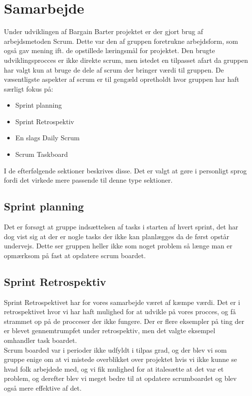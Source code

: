 \chapter{Samarbejde}

Under udviklingen af Bargain Barter projektet er der gjort brug af arbejdsmetoden Scrum. Dette var den af gruppen foretrukne arbejdsform, som også gav mening ift. de opstillede læringsmål for projektet. Den brugte udviklingsprocces er ikke direkte scrum, men istedet en tilpasset afart da gruppen har valgt kun at bruge de dele af scrum der bringer værdi til gruppen. De væsentligste aspekter af scrum er til gengæld opretholdt hvor gruppen har haft særligt fokus på:

\begin{itemize}
	\item Sprint planning
	\item Sprint Retrospektiv
	\item En slags Daily Scrum
	\item Scrum Taskboard
\end{itemize}

I de efterfølgende sektioner beskrives disse. Det er valgt at gøre i personligt sprog fordi det virkede mere passende til denne type sektioner. 

\section{Sprint planning}
Det er forsøgt at gruppe indsættelsen af tasks i starten af hvert sprint, det har dog vist sig at der er nogle tasks der ikke kan planlægges da de først opstår undervejs. Dette ser gruppen heller ikke som noget problem så længe man er opmærksom på fast at opdatere scrum boardet.  


\section{Sprint Retrospektiv}
Sprint Retrospektivet har for vores samarbejde været af kæmpe værdi. Det er i retrospektivet hvor vi har haft mulighed for at udvikle på vores procces, og få strammet op på de procceser der ikke fungere. Der er flere eksempler på ting der er blevet gennemtrumpfet under retrospektiv, men det valgte eksempel omhandler task boardet. \\

Scrum boarded var i perioder ikke udfyldt i tilpas grad, og der blev vi som gruppe enige om at vi mistede overblikket over projektet hvis vi ikke kunne se hvad folk arbejdede med, og vi fik mulighed for at italesætte at det var et problem, og derefter blev vi meget bedre til at opdatere scrumboardet og blev også mere effektive af det.

